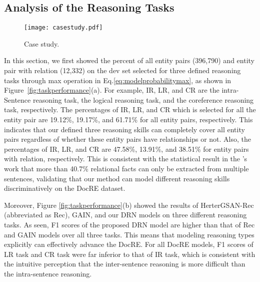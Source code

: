 \documentclass[11pt,a4paper]{article}
\begin{document}
\subsection{Analysis of the Reasoning Tasks}
\begin{figure*}[h!]
  \centering
  \texttt{[image: casestudy.pdf]}
  \caption{Case study.}
  \label{fig:casestudy}
\end{figure*}
In this section, we first showed the percent of all entity pairs (396,790) and entity pair with relation  (12,332) on the dev set selected for three defined reasoning tasks through max operation in Eq.\eqref{eq:modelprobabilitymax}, as shown in Figure~\ref{fig:taskperformance}(a).
For example, IR, LR, and CR are the intra-Sentence reasoning task, the logical reasoning task, and the coreference reasoning task, respectively.
The percentages of IR, LR, and CR which is selected for all the entity pair are 19.12\%, 19.17\%, and 61.71\% for all entity pairs, respectively.
This indicates that our defined three reasoning skills can completely cover all entity pairs regardless of whether these entity pairs have relationships or not.
Also, the percentages of IR, LR, and CR are 47.58\%, 13.91\%, and 38.51\% for entity pairs with relation, respectively.
This is consistent with the statistical result in the \citeauthor{yao-etal-2019-docred}'s work that more than 40.7\% relational facts can only be extracted from multiple sentences, validating that our method can model different reasoning skills discriminatively on the DocRE dataset.

Moreover, Figure \ref{fig:taskperformance}(b) showed the results of HerterGSAN-Rec (abbreviated as Rec), GAIN, and our DRN models on three different reasoning tasks.
As seen, F1 scores of the proposed DRN model are higher than that of Rec and GAIN models over all three tasks.
This means that modeling reasoning types explicitly can effectively advance the DocRE.
For all DocRE models, F1 scores of LR task and CR task were far inferior to that of IR task, which is consistent with the intuitive perception that the inter-sentence reasoning is more difficult than the intra-sentence reasoning.
\end{document}
